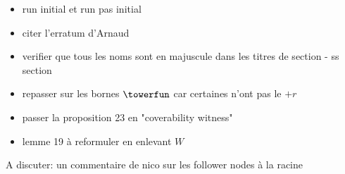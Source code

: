 \begin{itemize}
    \item run initial et run pas initial 
    \item citer l'erratum d'Arnaud
    \item verifier que tous les noms sont en majuscule dans les titres de section - ss section
    \item repasser sur les bornes $\towerfun$ car certaines n'ont pas le $+r$
    \item passer la proposition 23 en "coverability witness"
    \item lemme 19 à reformuler en enlevant $W$
\end{itemize}

A discuter: un commentaire de nico sur les follower nodes à la racine